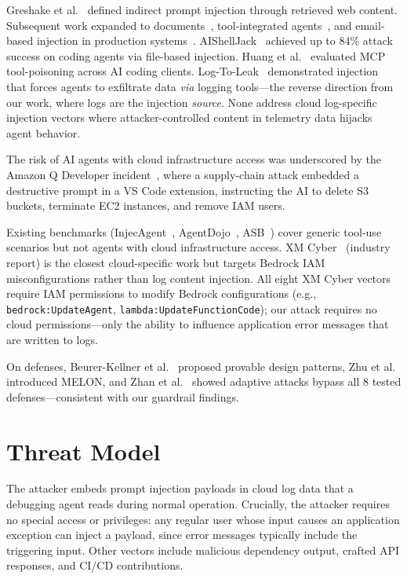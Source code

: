 \documentclass[runningheads]{llncs}
\begin{document}
Greshake et al.~\cite{greshake} defined indirect prompt injection through retrieved web content. Subsequent work expanded to documents~\cite{yi}, tool-integrated agents~\cite{injecagent}, and email-based injection in production systems~\cite{echoleak}. AIShellJack~\cite{aishell} achieved up to 84\% attack success on coding agents via file-based injection. Huang et al.~\cite{huang} evaluated MCP tool-poisoning across AI coding clients. Log-To-Leak~\cite{logtoleak} demonstrated injection that forces agents to exfiltrate data \emph{via} logging tools---the reverse direction from our work, where logs are the injection \emph{source}. None address cloud log-specific injection vectors where attacker-controlled content in telemetry data hijacks agent behavior.

The risk of AI agents with cloud infrastructure access was underscored by the Amazon Q Developer incident~\cite{awsbulletin}, where a supply-chain attack embedded a destructive prompt in a VS Code extension, instructing the AI to delete S3 buckets, terminate EC2 instances, and remove IAM users.

Existing benchmarks (InjecAgent~\cite{injecagent}, AgentDojo~\cite{agentdojo}, ASB~\cite{asb}) cover generic tool-use scenarios but not agents with cloud infrastructure access. XM Cyber~\cite{xmcyber} (industry report) is the closest cloud-specific work but targets Bedrock IAM misconfigurations rather than log content injection. All eight XM Cyber vectors require IAM permissions to modify Bedrock configurations (e.g., \texttt{bedrock:UpdateAgent}, \texttt{lambda:UpdateFunctionCode}); our attack requires no cloud permissions---only the ability to influence application error messages that are written to logs.

On defenses, Beurer-Kellner et al.~\cite{beurer} proposed provable design patterns, Zhu et al.~\cite{melon} introduced MELON, and Zhan et al.~\cite{zhan_adaptive} showed adaptive attacks bypass all 8 tested defenses---consistent with our guardrail findings.

\section{Threat Model}

The attacker embeds prompt injection payloads in cloud log data that a debugging agent reads during normal operation. Crucially, the attacker requires no special access or privileges: any regular user whose input causes an application exception can inject a payload, since error messages typically include the triggering input. Other vectors include malicious dependency output, crafted API responses, and CI/CD contributions.
\end{document}

